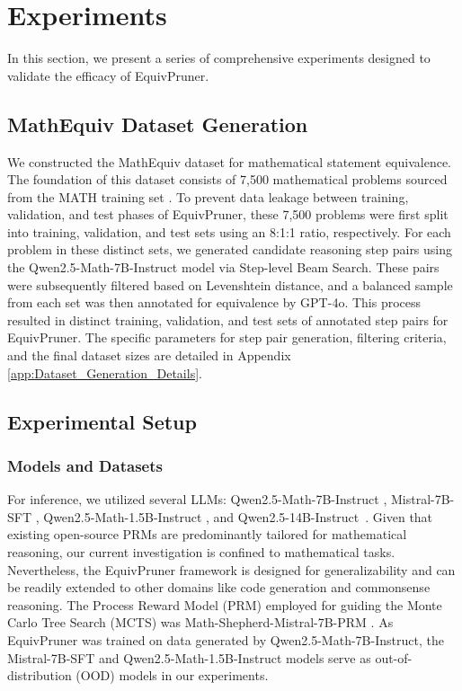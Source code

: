 \documentclass[11pt]{article}
\begin{document}
\section{Experiments}
\label{sec:Experiments}

In this section, we present a series of comprehensive experiments designed to validate the efficacy of  EquivPruner.

\subsection{MathEquiv Dataset Generation}
\label{subsec:MathEquiv_Dataset_Generation}

We constructed the MathEquiv dataset for mathematical statement equivalence. The foundation of this dataset consists of 7,500 mathematical problems sourced from the MATH training set \citep{hendrycks2021math}. To prevent data leakage between training, validation, and test phases of EquivPruner, these 7,500 problems were first split into training, validation, and test sets using an 8:1:1 ratio, respectively. For each problem in these distinct sets, we generated candidate reasoning step pairs using the Qwen2.5-Math-7B-Instruct model \citep{yang2024qwen2} via Step-level Beam Search. These pairs were subsequently filtered based on Levenshtein distance, and a balanced sample from each set was then annotated for equivalence by GPT-4o. This process resulted in distinct training, validation, and test sets of annotated step pairs for EquivPruner. The specific parameters for step pair generation, filtering criteria, and the final dataset sizes are detailed in Appendix \ref{app:Dataset_Generation_Details}.

\subsection{Experimental Setup}
\label{subsec:Experimental_Setup}

\subsubsection{Models and Datasets}
\label{subsubsec:Models_and_Datasets}

For inference, we utilized several LLMs: Qwen2.5-Math-7B-Instruct \citep{yang2024qwen2}, Mistral-7B-SFT \citep{shao2024deepseekmath}, Qwen2.5-Math-1.5B-Instruct \citep{yang2024qwen2}, and Qwen2.5-14B-Instruct~\citep{yang2024qwen2}. 
Given that existing open-source PRMs are predominantly tailored for mathematical reasoning, our current investigation is confined to mathematical tasks. Nevertheless, the EquivPruner framework is designed for generalizability and can be readily extended to other domains like code generation and commonsense reasoning. 
The Process Reward Model (PRM) employed for guiding the Monte Carlo Tree Search (MCTS) was Math-Shepherd-Mistral-7B-PRM \citep{shao2024deepseekmath}. As EquivPruner was trained on data generated by Qwen2.5-Math-7B-Instruct, the Mistral-7B-SFT and Qwen2.5-Math-1.5B-Instruct models serve as out-of-distribution (OOD) models in our experiments.
\end{document}

